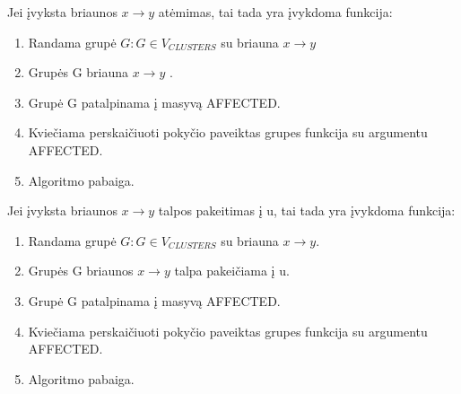 Jei įvyksta briaunos $x \rightarrow y$ atėmimas, tai tada yra įvykdoma funkcija:
\begin{enumerate}
\item Randama grupė $G : G \in V_{CLUSTERS}$ su briauna $x \rightarrow y$
\item Grupės G briauna $x \rightarrow y$ .
\item  Grupė G patalpinama į masyvą AFFECTED.
\item Kviečiama perskaičiuoti pokyčio paveiktas grupes funkcija su argumentu AFFECTED.
\item Algoritmo pabaiga. 
\end{enumerate}

Jei įvyksta briaunos $x \rightarrow y$ talpos pakeitimas į u, tai tada yra įvykdoma funkcija:
\begin{enumerate}
\item Randama grupė $G : G \in V_{CLUSTERS}$ su briauna $x \rightarrow y$.
\item Grupės G briaunos $x \rightarrow y$ talpa pakeičiama į u.
\item  Grupė G patalpinama į masyvą AFFECTED.
\item Kviečiama perskaičiuoti pokyčio paveiktas grupes funkcija su argumentu AFFECTED.
\item Algoritmo pabaiga. 
\end{enumerate}
